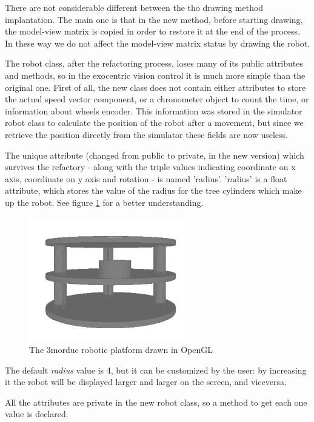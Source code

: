 %
There are not considerable different between the tho 
drawing method implantation. The main one is that in the 
new method, before starting drawing, the model-view matrix 
is copied in order to restore it at the end of the process. 
In these way we do not affect the model-view matrix status 
by drawing the robot.
%

%
The robot class, after the refactoring process, loses many 
of its public attributes and methods, so in the
exocentric vision control it is much more simple than the 
original one. First of all, the new class does not contain either
attributes to store the actual speed vector component, or 
a chronometer object to count the time, or information about wheels
encoder. This information was stored in the simulator robot 
class to calculate the position of the robot after a movement,
but since we retrieve the position directly from the simulator 
these fields are now useless. 
%

%
The unique attribute (changed from public to private, in 
the new version) which survives the refactory - along with the
triple values indicating coordinate on x axis, coordinate on 
y axis and rotation - is named 'radius'. 'radius' is a float
attribute, which stores the value of the radius for the 
tree cylinders which make up the robot. See figure
\ref{fig:3morduc_opengl} for a better understanding.
%
\begin{figure}[!h]
  \begin{center}
    \includegraphics[width=200pt]{img/3morduc_opengl}  %
    \caption{The 3morduc robotic platform drawn in OpenGL}
    \label{fig:3morduc_opengl}
  \end{center}
\end{figure}
%
The default \textit{radius} value is 4, but it can be 
customized by the user: by increasing it the robot will be 
displayed larger and larger on the screen, and viceversa.
%

%
All the attributes are private in the new robot class, 
so a method to get each one value is declared. 
%

